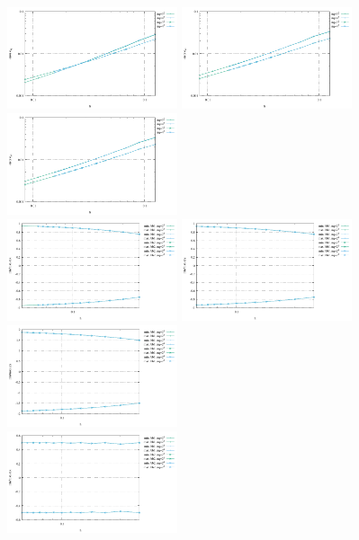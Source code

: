 \begin{center}
\includegraphics[width=5cm]{python_codes/fieldstone_75/results/mms3D/errors_exy}
\includegraphics[width=5cm]{python_codes/fieldstone_75/results/mms3D/errors_exz}
\includegraphics[width=5cm]{python_codes/fieldstone_75/results/mms3D/errors_eyz}\\
\includegraphics[width=5cm]{python_codes/fieldstone_75/results/mms3D/exx_stats.pdf}
\includegraphics[width=5cm]{python_codes/fieldstone_75/results/mms3D/eyy_stats.pdf}
\includegraphics[width=5cm]{python_codes/fieldstone_75/results/mms3D/ezz_stats.pdf}\\
\includegraphics[width=5cm]{python_codes/fieldstone_75/results/mms3D/exy_stats.pdf}

\end{center}
